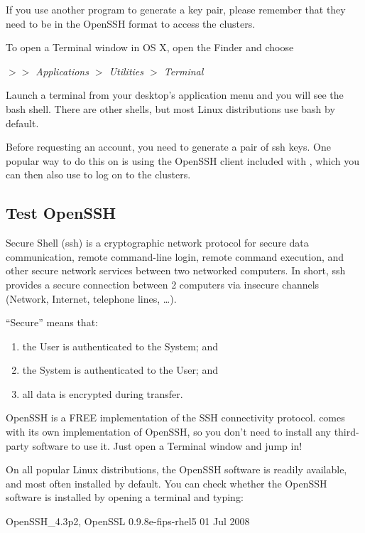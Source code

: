   If you use another program to generate a key pair, please remember that they
  need to be in the OpenSSH format to access the \hpc clusters.
\fi %

\ifmac
  To open a Terminal window in OS X, open the Finder and choose

  \emph{$>$$>$ Applications $>$ Utilities $>$ Terminal}
\fi

\iflinux
  Launch a terminal from your desktop's application menu and you will see the
  bash shell.
  There are other shells, but most Linux distributions use bash by default.
\fi

\ifmacORlinux
  Before requesting an account, you need to generate a pair of ssh keys. One
  popular way to do this on \OS is using the OpenSSH client included with \OS
  , which you can then also use to log on to the clusters.

  \subsection{Test OpenSSH}
  \label{sec:test-openssh}

  Secure Shell (ssh) is a cryptographic network protocol for secure data
  communication, remote command-line login, remote command execution, and other
  secure network services between two networked computers. In short, ssh
  provides a secure connection between 2 computers via insecure channels
  (Network, Internet, telephone lines, \ldots).

  ``Secure'' means that:
  \begin{enumerate}
    \item  the User is authenticated to the System; and
    \item  the System is authenticated to the User; and
    \item  all data is encrypted during transfer.
  \end{enumerate}

  OpenSSH is a FREE implementation of the SSH connectivity protocol. \OS comes
  with its own implementation of OpenSSH, so you don't need to install any
  third-party software to use it. Just open a Terminal window and jump in!

  On all popular Linux distributions, the OpenSSH software is readily
  available, and most often installed by default. You can check whether the
  OpenSSH software is installed by opening a terminal and typing:

\begin{prompt}
OpenSSH_4.3p2, OpenSSL 0.9.8e-fips-rhel5 01 Jul 2008
\end{prompt}

